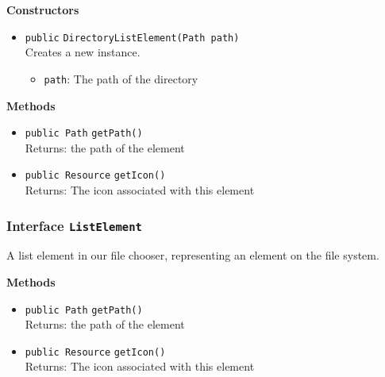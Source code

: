\textbf{Constructors}
\begin{itemize}
\item \lstinline|public| \lstinline|DirectoryListElement|\lstinline|(Path path)|\\
Creates a new instance.
\begin{itemize}
\item \lstinline|path|: The path of the directory
\end{itemize}



\end{itemize}


\textbf{Methods}
\begin{itemize}
\item \lstinline|public Path| \lstinline|getPath|\lstinline|()|\\
Returns: the path of the element



\item \lstinline|public Resource| \lstinline|getIcon|\lstinline|()|\\
Returns: The icon associated with this element



\end{itemize}

\subsubsection{Interface \lstinline|ListElement|}
A list element in our file chooser, representing an element on the file system. \\






\textbf{Methods}
\begin{itemize}
\item \lstinline|public Path| \lstinline|getPath|\lstinline|()|\\
Returns: the path of the element



\item \lstinline|public Resource| \lstinline|getIcon|\lstinline|()|\\
Returns: The icon associated with this element



\end{itemize}


